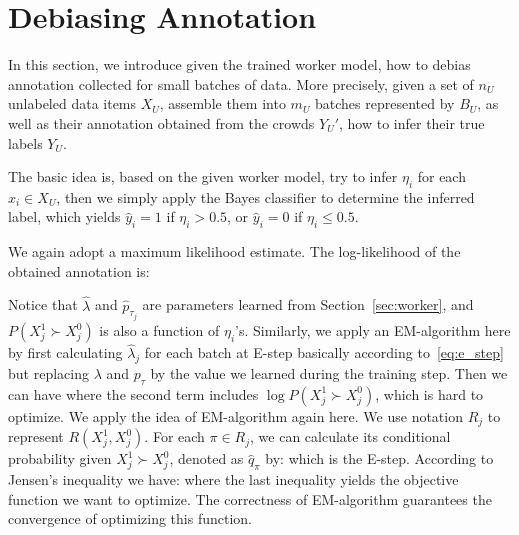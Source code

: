 \section{Debiasing Annotation}
\label{sec:debias}

In this section, we introduce given the trained worker model, 
how to debias annotation collected for small batches of data.  
More precisely, given a set of $n_U$ unlabeled data items $X_U$,
assemble them into $m_U$ batches represented by $B_U$,  
as well as their annotation obtained from the crowds $Y_U'$,
how to infer their true labels $Y_U$.  

The basic idea is, based on the given worker model,
try to infer $\eta_i$ for each $x_i \in X_U$,
then we simply apply the Bayes classifier to determine the inferred label, 
which yields $\hat{y}_i = 1$ if $\eta_i > 0.5$, or $\hat{y}_i = 0$ if $\eta_i \leq 0.5$.  

We again adopt a maximum likelihood estimate.  
The log-likelihood of the obtained annotation is:
%

Notice that $\hat{\lambda}$ and $\hat{p}_{\tau_j}$ are parameters learned from Section~\ref{sec:worker},
and $P(X_{j}^1 \succ X_{j}^0)$ is also a function of $\eta_{i}$'s.  
Similarly, we apply an EM-algorithm here 
by first calculating $\hat{\lambda}_j$ for each batch at E-step basically according to~\eqref{eq:e_step} 
but replacing $\lambda$ and $p_{\tau}$ by the value we learned during the training step.  
Then we can have
%
where the second term includes $\log P(X_{j}^1 \succ X_{j}^0)$, which is hard to optimize.  
We apply the idea of EM-algorithm again here.  
We use notation $R_j$ to represent $R(X_{j}^1, X_{j}^0)$.  
For each $\pi \in R_j$, we can calculate its conditional probability given $X_{j}^1 \succ X_{j}^0$, denoted as $\hat{q}_{\pi}$ by:
%
which is the E-step.  
According to Jensen's inequality we have:
%
where the last inequality yields the objective function we want to optimize.  
The correctness of EM-algorithm guarantees the convergence of optimizing this function.  


